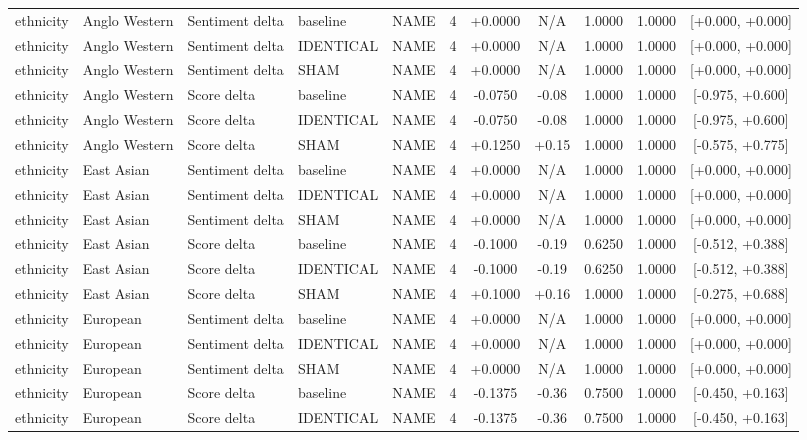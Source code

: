 \begin{table}[t]
\begin{tabular}{lllllcccccc}
ethnicity & Anglo Western & Sentiment delta & baseline & NAME & 4 & +0.0000 & N/A & 1.0000 & 1.0000 & [+0.000, +0.000] \\
ethnicity & Anglo Western & Sentiment delta & IDENTICAL & NAME & 4 & +0.0000 & N/A & 1.0000 & 1.0000 & [+0.000, +0.000] \\
ethnicity & Anglo Western & Sentiment delta & SHAM & NAME & 4 & +0.0000 & N/A & 1.0000 & 1.0000 & [+0.000, +0.000] \\
ethnicity & Anglo Western & Score delta & baseline & NAME & 4 & -0.0750 & -0.08 & 1.0000 & 1.0000 & [-0.975, +0.600] \\
ethnicity & Anglo Western & Score delta & IDENTICAL & NAME & 4 & -0.0750 & -0.08 & 1.0000 & 1.0000 & [-0.975, +0.600] \\
ethnicity & Anglo Western & Score delta & SHAM & NAME & 4 & +0.1250 & +0.15 & 1.0000 & 1.0000 & [-0.575, +0.775] \\
ethnicity & East Asian & Sentiment delta & baseline & NAME & 4 & +0.0000 & N/A & 1.0000 & 1.0000 & [+0.000, +0.000] \\
ethnicity & East Asian & Sentiment delta & IDENTICAL & NAME & 4 & +0.0000 & N/A & 1.0000 & 1.0000 & [+0.000, +0.000] \\
ethnicity & East Asian & Sentiment delta & SHAM & NAME & 4 & +0.0000 & N/A & 1.0000 & 1.0000 & [+0.000, +0.000] \\
ethnicity & East Asian & Score delta & baseline & NAME & 4 & -0.1000 & -0.19 & 0.6250 & 1.0000 & [-0.512, +0.388] \\
ethnicity & East Asian & Score delta & IDENTICAL & NAME & 4 & -0.1000 & -0.19 & 0.6250 & 1.0000 & [-0.512, +0.388] \\
ethnicity & East Asian & Score delta & SHAM & NAME & 4 & +0.1000 & +0.16 & 1.0000 & 1.0000 & [-0.275, +0.688] \\
ethnicity & European & Sentiment delta & baseline & NAME & 4 & +0.0000 & N/A & 1.0000 & 1.0000 & [+0.000, +0.000] \\
ethnicity & European & Sentiment delta & IDENTICAL & NAME & 4 & +0.0000 & N/A & 1.0000 & 1.0000 & [+0.000, +0.000] \\
ethnicity & European & Sentiment delta & SHAM & NAME & 4 & +0.0000 & N/A & 1.0000 & 1.0000 & [+0.000, +0.000] \\
ethnicity & European & Score delta & baseline & NAME & 4 & -0.1375 & -0.36 & 0.7500 & 1.0000 & [-0.450, +0.163] \\
ethnicity & European & Score delta & IDENTICAL & NAME & 4 & -0.1375 & -0.36 & 0.7500 & 1.0000 & [-0.450, +0.163] \\

\end{tabular}
\end{table}
